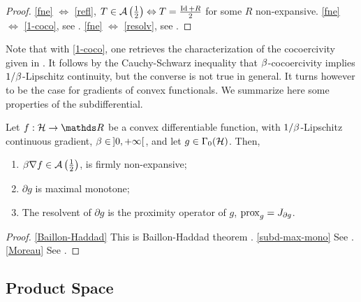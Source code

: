 \begin{proof}
\ref{fne} $\Leftrightarrow$ \ref{refl}, $T \in \mathcal{A}\left(  {\textstyle \frac{1}{2}}  \right) \Leftrightarrow T = \frac{\operatorname{Id} + R}{2}$ for some $R$ non-expansive.
\ref{fne} $\Leftrightarrow$ \ref{1-coco}, see \cite{Zarantonello71}.
\ref{fne} $\Leftrightarrow$ \ref{resolv}, see \cite{Minty62}.
\end{proof}

Note that with \ref{1-coco}, one retrieves the characterization of the cocoercivity given in . It follows by the Cauchy-Schwarz inequality that $\beta$-cocoercivity implies $1/\beta$-Lipschitz continuity, but the converse is not true in general. It turns however to be the case for gradients of convex functionals. We summarize here some properties of the subdifferential.

\begin{lemma} Let $f : \Hh \to \R$ be a convex differentiable function, with $1/\beta$-Lipschitz continuous gradient, $\beta \in \, ]0,{+}\infty[$, and let $g \in \Gamma_0(\mathcal{H})$. Then,
\begin{enumerate}[label={\rm (\roman{*})}, ref={\rm (\roman{*})}]
\item{\label{Baillon-Haddad}} $\beta \nabla f \in \mathcal{A}\left(  {\textstyle \frac{1}{2}}  \right)$, \ie is firmly non-expansive;
\item{\label{subd-max-mono}} $\partial g$ is maximal monotone;
\item{\label{Moreau}} The resolvent of $\partial g$ is the proximity operator of $g$, \ie $\operatorname{prox}_{g} = J_{\partial g}$.
\end{enumerate} 
\label{lem:subd}
\end{lemma}

\begin{proof}
\ref{Baillon-Haddad} This is Baillon-Haddad theorem \cite{BaillonHaddad77}.
\ref{subd-max-mono} See \cite{Rockafellar70}.
\ref{Moreau} See \cite{Moreau65}.
\end{proof}

\subsection{Product Space}
\label{sec:prod-space}

